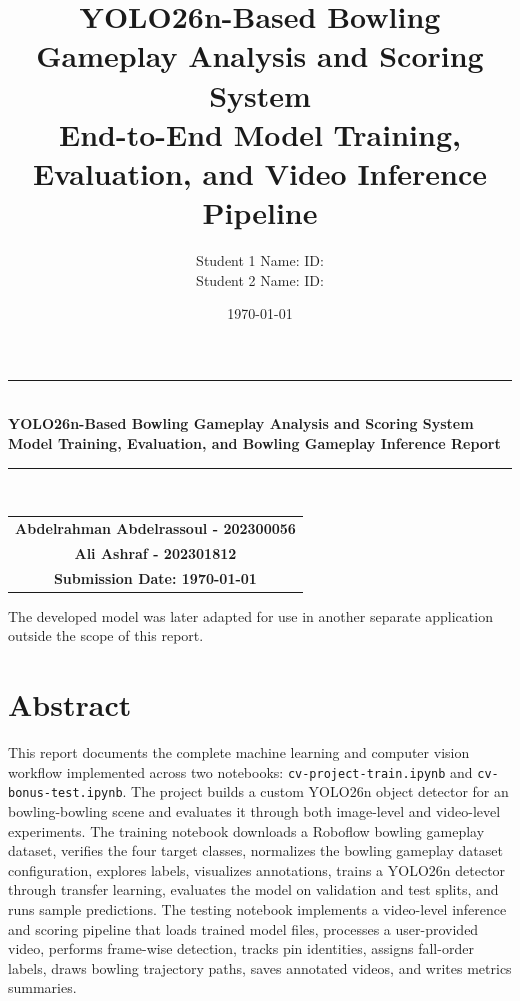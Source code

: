 \documentclass[12pt,a4paper]{article}
\title{\textbf{YOLO26n-Based Bowling Gameplay Analysis and Scoring System}\\
\large End-to-End Model Training, Evaluation, and Video Inference Pipeline}
\author{
Student 1 Name: \underline{\hspace{5cm}} \quad ID: \underline{\hspace{3cm}}\\[0.5em]
Student 2 Name: \underline{\hspace{5cm}} \quad ID: \underline{\hspace{3cm}}
}
\date{\today}
\begin{document}
\begin{titlepage}
    \centering
    \vspace*{1cm}

    \rule{\textwidth}{1pt}\\[0.4cm]
    {\Huge \textbf{YOLO26n-Based Bowling Gameplay Analysis and Scoring System}}\\[0.4cm]
    {\Large \textbf{Model Training, Evaluation, and Bowling Gameplay Inference Report}}\\[0.4cm]
    \rule{\textwidth}{1pt}\\[1.5cm]

\vfill

\begin{center}
\begin{tabular}{c}
\textbf{\large Abdelrahman Abdelrassoul - 202300056} \\[0.45cm]

\textbf{\large Ali Ashraf - 202301812} \\[0.8cm]

\textbf{Submission Date: \today}
\end{tabular}
\end{center}

\vfill
\end{titlepage}

\tableofcontents


\noindent The developed model was later adapted for use in another separate application outside the scope of this report.

\newpage
\listoffigures
\newpage
\listoftables
\newpage
{}


\section{Abstract}

This report documents the complete machine learning and computer vision workflow implemented across two notebooks: \texttt{cv-project-train.ipynb} and \texttt{cv-bonus-test.ipynb}. The project builds a custom YOLO26n object detector for an bowling-bowling scene and evaluates it through both image-level and video-level experiments. The training notebook downloads a Roboflow bowling gameplay dataset, verifies the four target classes, normalizes the bowling gameplay dataset configuration, explores labels, visualizes annotations, trains a YOLO26n detector through transfer learning, evaluates the model on validation and test splits, and runs sample predictions. The testing notebook implements a video-level inference and scoring pipeline that loads trained model files, processes a user-provided video, performs frame-wise detection, tracks pin identities, assigns fall-order labels, draws bowling trajectory paths, saves annotated videos, and writes metrics summaries.
\end{document}
